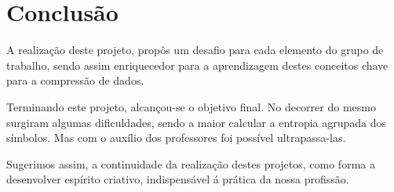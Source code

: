 \documentclass[11pt]{article}
\begin{document}
\newpage
\section{Conclusão}
A realização deste projeto, propôs um desafio para cada elemento do grupo de trabalho, sendo assim enriquecedor para a aprendizagem destes conceitos chave para a compressão de dados.
\par
Terminando este projeto, alcançou-se o objetivo final. No decorrer do mesmo surgiram algumas dificuldades, sendo a maior calcular a entropia agrupada dos símbolos. Mas com o auxílio dos professores foi possível ultrapassa-las.
\par
Sugerimos assim, a continuidade da realização destes projetos, como forma a desenvolver espírito criativo, indispensável á prática da nossa profissão.

\newpage
\appendix
\end{document}
